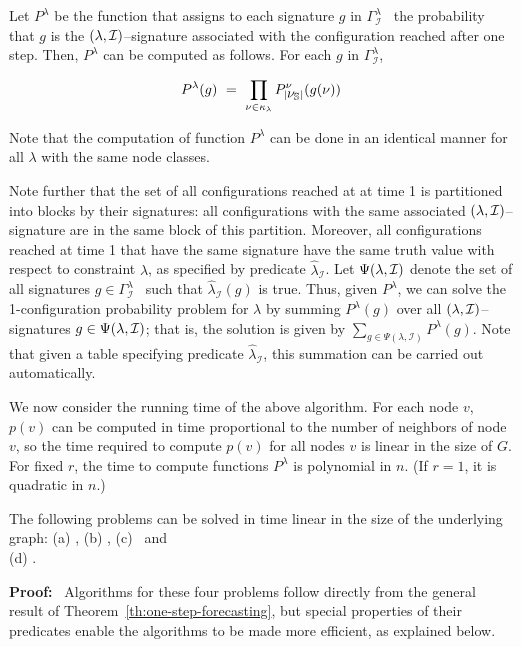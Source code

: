Let $P^\lambda$ be the function that assigns to each signature $g$ in
$\Gamma_{\mathcal{I}}^{\lambda}$~ the probability that $g$ is the
$(\lambda,\mbox{${\cal I}$}{})$--signature associated with the configuration
reached after one step.
Then, $P^\lambda$ can be computed as follows.
For each $g$ in $\Gamma_{\mathcal{I}}^{\lambda}$,

\[ \displaystyle{
P^\lambda(g) ~=~  \prod_{\nu \in \kappa_{\lambda}} P_{|\mbox{$\nu_{\mathbb{S}}$}|}^\nu}(g(\nu))
\]

Note that the computation of function $P^\lambda$ can be done in an
identical manner for all  $\lambda$ with the same node classes.

Note further that the set of all configurations reached at at time 1
is partitioned into blocks by their signatures:
all configurations with the same associated 
$(\lambda,\mbox{${\cal I}$}{})$--signature 
are in the same block of this partition.
Moreover, all configurations reached at time 1
that have the same signature 
have the same truth value with respect to constraint $\lambda$,
as specified by predicate $\widehat{\lambda}_{\mathcal{I}}$.
Let $\Psi(\lambda, \mbox{${\cal I}$})$ denote the set of all
signatures $g \in \Gamma_{\mathcal{I}}^{\lambda}$~
such that $\widehat{\lambda}_{\mathcal{I}}(g)$ is true.
Thus, given $P^\lambda$, we can solve the 
1-configuration probability problem for $\lambda$
by summing $P^{\lambda}(g)$ over all 
$(\lambda,\mbox{${\cal I}$}{})$--signatures $g \in \Psi(\lambda, \mbox{${\cal I}$})$;
that is, the solution is given by 
$\displaystyle{\sum_{g \in \Psi(\lambda, \mathcal{I})} P^{\lambda}(g)}$.
Note that given a table specifying predicate $\widehat{\lambda}_{\mathcal{I}}$,
this summation can be carried out automatically.

\medskip
We now consider the running time of the above algorithm.  
For each node $v$,
$p(v)$ can be computed in time proportional to the number of neighbors
of node $v$, so the time required to compute $p(v)$ for all nodes
$v$ is linear in the size of $G$.  For fixed $r$, the time to
compute functions $P^\lambda$ is
polynomial in $n$.  (If $r = 1$, it is quadratic in $n$.)
\QED
  
\begin{corollary}\label{cor:gen_easy_time_1}
The following problems can be solved in time linear in the size of the underlying graph:
(a) \OneNewInfs, (b) \OneTotInfs{}, (c) \OneVuls{} ~and \\ (d) \OneTotVuls{}.
\end{corollary}

\noindent
\textbf{Proof:}~ Algorithms for these four problems follow directly 
from the general result of Theorem~\ref{th:one-step-forecasting},
but special properties of their predicates enable the algorithms to be made more efficient,
as explained below.

